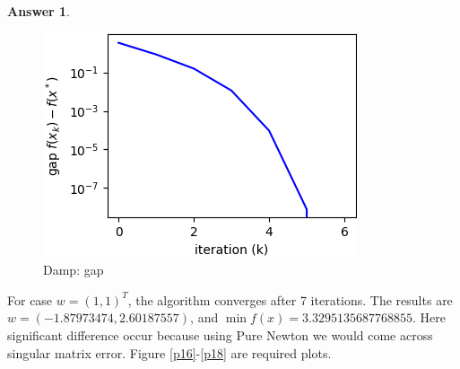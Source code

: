 \documentclass{article}
\theoremstyle{definition}
\newtheorem{ans}{Answer}
\begin{document}
\begin{ans}
\begin{enumerate}[(a)]
\begin{figure}[h]
\begin{minipage}[t]{0.33\linewidth}
					\includegraphics[width=1\linewidth]{../figures/1b/dnt_gap0}
					\caption{Damp: gap}
					\label{p15}
				\end{minipage}		
			\end{figure}
			
			For case $w=(1,1)^T$, the algorithm converges after 7 iterations. The results are $w=(-1.87973474,2.60187557)$, and $\min f(x)=3.3295135687768855$. Here significant difference occur because using Pure Newton we would come across singular matrix error. Figure \ref{p16}-\ref{p18} are required plots. 
			

\end{enumerate}
\end{ans}
\end{document}
